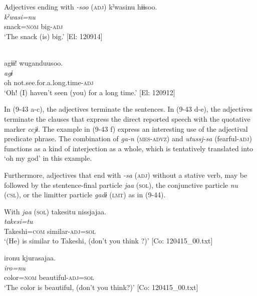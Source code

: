 \exi{} Adjectives ending with \textit{{}-soo} (\textsc{adj})
\ex %
\glll   kˀwasinu  hɨɨsoo.\\
      \textit{kˀwasi=nu}  \textit{}\\
      snack=\textsc{nom}  big-\textsc{adj}\\
      \glt       ‘The snack (is) big.’ [El: 120914]

\ex\relax [= (4-50 b)]\\
    \glll  agɨɨ!  wuganduusoo.\\
      \textit{agɨ}  \textit{}\\
      oh  not.see.for.a.long.time-\textsc{adj}\\
      \glt       ‘Oh! (I) haven’t seen (you) for a long time.’ [El: 120912]
    \z
\z

In (9-43 a-c), the adjectives terminate the sentences. In (9-43 d-e), the adjectives terminate the clauses that express the direct reported speech with the quotative marker \textit{ccjɨ}. The example in (9-43 f) express an interesting use of the adjectival predicate phrase. The combination of \textit{ga-n} (\textsc{mes}-\textsc{advz}) and \textit{utussj-sa} (fearful-\textsc{adj}) functions as a kind of interjection as a whole, which is tentatively translated into ‘oh my god’ in this example.

  Furthermore, adjectives that end with \textit{-sa} (\textsc{adj}) without a stative verb, may be followed by the stentence-final particle \textit{jaa} (\textsc{sol}), the conjunctive particle \textit{nu} (\textsc{csl}), or the limitter particle \textit{gadɨ} (\textsc{lmt}) as in (9-44).

\ea   With \textit{jaa} (\textsc{sol}) \label{ex:9.44}
\ea %
 \glll  takesitu  nissjajaa.\\
      \textit{takesi=tu}  \textit{}\\
      Takeshi=\textsc{com}  similar-\textsc{adj}=\textsc{sol}\\
      \glt       ‘(He) is similar to Takeshi, (don’t you think ?)’ [Co: 120415\_00.txt]

\ex \label{ex:9.44b} %
    \glll  {\textbar}iro{\textbar}nu  kjurasajaa.\\
      \textit{iro=nu}  \textit{}\\
      color=\textsc{nom}  beautiful-\textsc{adj}=\textsc{sol}\\
      \glt       ‘The color is beautiful, (don’t you think?)’ [Co: 120415\_00.txt]

